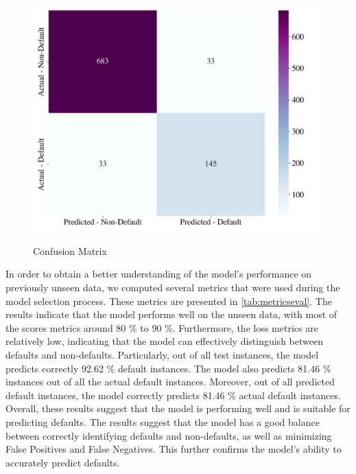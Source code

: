 \begin{figure}[H]
\centering
\caption{Confusion Matrix}\vspace{0.5em}
\label{fig:confmat}\
\includegraphics[width=130mm]{Figures/Confusion_Matrix.jpg}

\vspace{-1em}
\end{figure}

In order to obtain a better understanding of the model's performance on previously unseen data, we computed several metrics that were used during the model selection process.
These metrics are presented in \autoref{tab:metricseval}. The results indicate that the model performs well on the unseen data, with most of the scores metrics around 80 \% to 90 \%.
Furthermore, the loss metrics are relatively low, indicating that the model can effectively distinguish between defaults and non-defaults.
Particularly, out of all test instances, the model predicts correctly 92.62 \% default instances. The model also predicts 81.46 \% instances out of all the actual default instances. Moreover, out of all predicted default instances, the model correctly predicts 81.46 \% actual default instances.
Overall, these results suggest that the model is performing well and is suitable for predicting defaults.
The results suggest that the model has a good balance between correctly identifying defaults and non-defaults, as well as minimizing False Positives and False Negatives. This further confirms the model's ability to accurately predict defaults.

